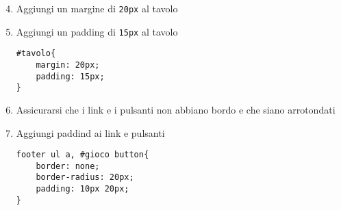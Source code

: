 \begin{frame}[fragile]\transfade
  \begin{sol}\centering
    \begin{enumerate}
      \setcounter{enumi}{3}
      \item Aggiungi un margine di \texttt{20px} al tavolo
      \item Aggiungi un padding di \texttt{15px} al tavolo
      \begin{verbatim}
#tavolo{
    margin: 20px;
    padding: 15px;
}
      \end{verbatim}
    \item Assicurarsi che i link e i pulsanti non abbiano bordo e che siano arrotondati
    \item Aggiungi paddind ai link e pulsanti
    \begin{verbatim}
footer ul a, #gioco button{
    border: none;
    border-radius: 20px;
    padding: 10px 20px;
}
    \end{verbatim}
    \end{enumerate}
  \end{sol}
\end{frame}
